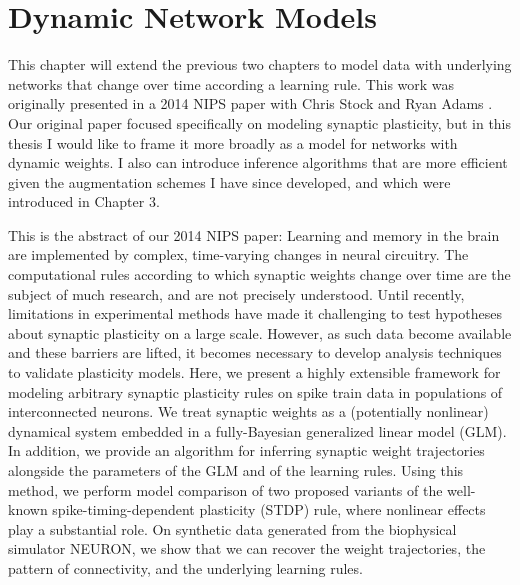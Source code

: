 
\chapter{Dynamic Network Models}

This chapter will extend the previous two chapters to model data with 
underlying networks that change over time according a learning rule. 
This work was originally presented in a 2014 NIPS paper with Chris Stock
and Ryan Adams \cite{linderman2014framework}. Our original paper 
focused specifically on modeling synaptic plasticity, but in this 
thesis I would like to frame it more broadly as a model for networks 
with dynamic weights. I also can introduce inference algorithms that 
are more efficient given the \polyagamma augmentation schemes I have 
since developed, and which were introduced in Chapter 3.

This is the abstract of our 2014 NIPS paper:
Learning and memory in the brain are implemented by complex,
time-varying changes in neural circuitry. The computational rules
according to which synaptic weights change over time are the subject
of much research, and are not precisely understood. Until recently,
limitations in experimental methods have made it challenging to test
hypotheses about synaptic plasticity on a large scale.  However, as
such data become available and these barriers are lifted, it becomes
necessary to develop analysis techniques to validate plasticity
models.  Here, we present a highly extensible framework for modeling
arbitrary synaptic plasticity rules on spike train data in populations
of interconnected neurons. We treat synaptic weights as a (potentially
nonlinear) dynamical system embedded in a fully-Bayesian generalized
linear model (GLM). In addition, we provide an algorithm for inferring
synaptic weight trajectories alongside the parameters of the GLM and
of the learning rules. Using this method, we perform model comparison
of two proposed variants of the well-known spike-timing-dependent
plasticity (STDP) rule, where nonlinear effects play a substantial
role. On synthetic data generated from the biophysical simulator
NEURON, we show that we can recover the weight trajectories, the
pattern of connectivity, and the underlying learning rules.

